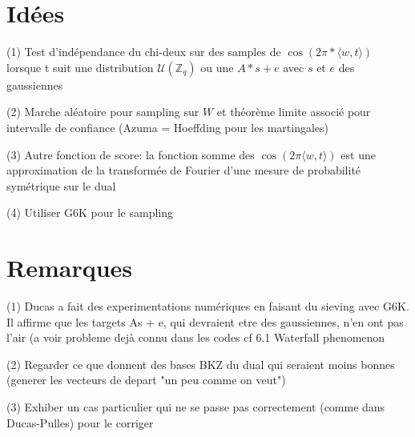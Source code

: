 \documentclass{article}
\begin{document}
\section{Idées}

(1) Test d'indépendance du chi-deux sur des samples de $\cos(2  \pi * \langle w , t \rangle)$ lorsque t suit une distribution $\mathcal U(\mathbb Z_q)$ ou une $A * s + e$ avec $s$ et $e$ des gaussiennes 
 
(2) Marche aléatoire pour sampling sur $W$ et théorème limite associé pour intervalle de confiance (Azuma = Hoeffding pour les martingales) 
 
(3) Autre fonction de score: la fonction somme des $\cos(2 \pi \langle w,t\rangle )$ est une approximation de la transformée de Fourier d'une mesure de probabilité symétrique sur le dual

(4) Utiliser G6K pour le sampling

\section{Remarques}   

(1) Ducas a fait des experimentations numériques en faisant du sieving avec G6K. Il affirme que les targets As + e, qui devraient etre des gaussiennes, n'en ont pas l'air (a voir probleme dejà connu dans les codes cf 6.1 Waterfall phenomenon

(2) Regarder ce que donnent des bases BKZ du dual qui seraient moins bonnes (generer les vecteurs de depart "un peu comme on veut")

(3) Exhiber un cas particulier qui ne se passe pas correctement (comme dans Ducas-Pulles) pour le corriger



\end{document}
